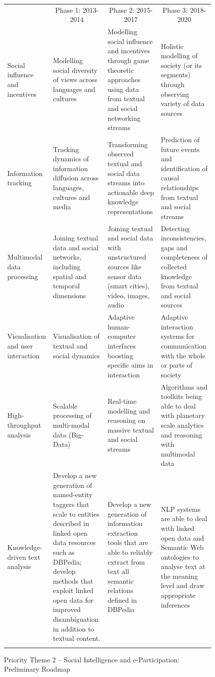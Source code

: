 \documentclass[10pt, plain]{../../metanetpaper}
\begin{document}
\begin{multicols}{2}
\begin{figure}[htb]
  \centering
  \small
  \begin{tabular}{@{}p{2.5cm}p{4cm}p{4cm}p{4cm}@{}} \toprule\addlinespace
    \multicolumn{1}{c}{Research Priority} & \multicolumn{1}{c}{Phase 1: 2013-2014} & \multicolumn{1}{c}{Phase 2: 2015-2017} & \multicolumn{1}{c}{Phase 3: 2018-2020} \\ \addlinespace\midrule\addlinespace
    Social influence and incentives & Modelling social diversity of views across languages and cultures & Modelling social influence and incentives  through game theoretic approaches using data from textual and social networking streams & Holistic modelling of society (or its segments) through observing variety of data sources \\ \addlinespace
    Information tracking & Tracking dynamics of information diffusion across languages, cultures and media & Transforming observed textual and social data streams into actionable deep knowledge representations & Prediction of future events and identification of causal relationships from textual and social streams \\ \addlinespace
    Multimodal data processing & Joining textual data and social networks, including spatial and temporal dimensions & Joining textual and social data with unstructured sources like sensor data (smart cities), video, images, audio & Detecting inconsistencies, gaps and completeness of collected knowledge from textual and social sources \\ \addlinespace
    Visualisation and user interaction & Visualisation of textual and social dynamics & Adaptive human-computer interfaces boosting specific aims in interaction & Adaptive interaction systems for communication with the whole or parts of society \\ \addlinespace
    High-throughput analysis & Scalable processing of multi-modal data (Big-Data) & Real-time modelling and reasoning on massive textual and social streams & Algorithms and toolkits being able to deal with planetary scale analytics and reasoning with multimodal data \\ \addlinespace
    Knowledge-driven text analysis & Develop a new generation of named-entity taggers that scale to entities described in linked open data resources such as DBPedia; develop methods that exploit linked open data for improved disambiguation in addition to textual content. & Develop a new generation of information extraction tools that are able to reliably extract from text all semantic relations defined in DBPedia & NLP systems are able to deal with linked open data and Semantic Web ontologies to analyse text at the meaning level and draw appropriate inferences \\  \addlinespace\bottomrule
  \end{tabular}
  \caption{Priority Theme 2 -- Social Intelligence and e-Participation: Preliminary Roadmap}
  \label{fig:pt2-roadmap}
\end{figure}


\end{multicols}
\end{document}

